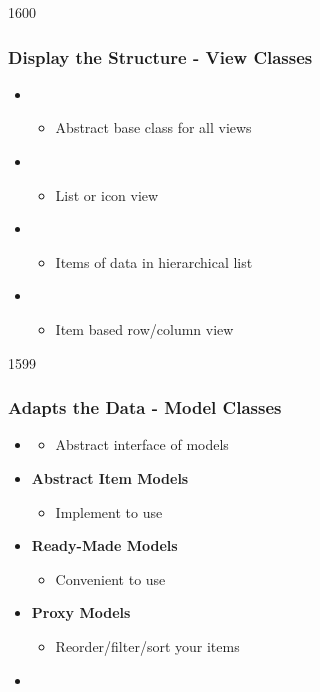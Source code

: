 \begin{slide}{1600}\frametitle{Display the Structure - View Classes}
\begin{itemize}
 \item {}
   \begin{itemize}
   \item Abstract base class for all views
   \end{itemize}
\item {}
  \begin{itemize}
  \item List or icon view
  \end{itemize}
\item {}
  \begin{itemize}
  \item Items of data in hierarchical list
  \end{itemize}
\item {}
  \begin{itemize}
  \item Item based row/column view
  \end{itemize}
\end{itemize}
\end{slide}

\begin{slide}{1599}\frametitle{Adapts the Data - Model Classes}
  \begin{itemize}
  \item \textbf{}
    \begin{itemize}
    \item Abstract interface of models
   \end{itemize}
  \item \textbf{Abstract Item Models}
    \begin{itemize}
    \item Implement to use
 \end{itemize}
  \item \textbf{Ready-Made Models}
    \begin{itemize}
    \item Convenient to use
  \end{itemize}
 \item \textbf{Proxy Models}
   \begin{itemize}
   \item Reorder/filter/sort your items
  \end{itemize}
   \item[] 
 \end{itemize}
\end{slide}

